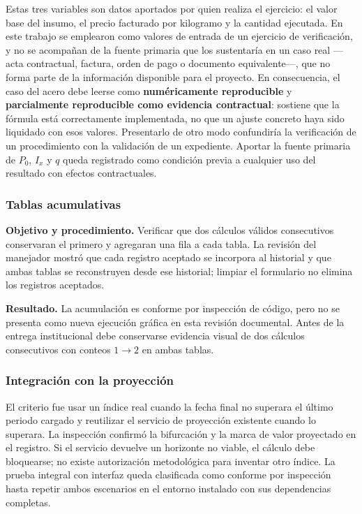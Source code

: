 \documentclass[12pt,letterpaper]{article}
\begin{document}
Estas tres variables son datos aportados por quien realiza el ejercicio: el valor base del insumo, el precio facturado por kilogramo y la cantidad ejecutada. En este trabajo se emplearon como valores de entrada de un ejercicio de verificación, y no se acompañan de la fuente primaria que los sustentaría en un caso real ---acta contractual, factura, orden de pago o documento equivalente---, que no forma parte de la información disponible para el proyecto. En consecuencia, el caso del acero debe leerse como \textbf{numéricamente reproducible} y \textbf{parcialmente reproducible como evidencia contractual}: sostiene que la fórmula está correctamente implementada, no que un ajuste concreto haya sido liquidado con esos valores. Presentarlo de otro modo confundiría la verificación de un procedimiento con la validación de un expediente. Aportar la fuente primaria de \(P_0\), \(I_x\) y \(q\) queda registrado como condición previa a cualquier uso del resultado con efectos contractuales.

\subsubsection{Tablas acumulativas}

\textbf{Objetivo y procedimiento.} Verificar que dos cálculos válidos consecutivos conservaran el primero y agregaran una fila a cada tabla. La revisión del manejador mostró que cada registro aceptado se incorpora al historial y que ambas tablas se reconstruyen desde ese historial; limpiar el formulario no elimina los registros aceptados.

\textbf{Resultado.} La acumulación es conforme por inspección de código, pero no se presenta como nueva ejecución gráfica en esta revisión documental. Antes de la entrega institucional debe conservarse evidencia visual de dos cálculos consecutivos con conteos \(1\rightarrow2\) en ambas tablas.

\subsubsection{Integración con la proyección}

El criterio fue usar un índice real cuando la fecha final no superara el último periodo cargado y reutilizar el servicio de proyección existente cuando lo superara. La inspección confirmó la bifurcación y la marca de valor proyectado en el registro. Si el servicio devuelve un horizonte no viable, el cálculo debe bloquearse; no existe autorización metodológica para inventar otro índice. La prueba integral con interfaz queda clasificada como conforme por inspección hasta repetir ambos escenarios en el entorno instalado con sus dependencias completas.
\end{document}
